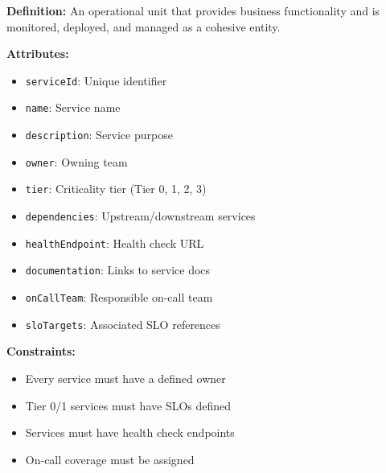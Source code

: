 \documentclass[11pt,letterpaper]{article}
\begin{document}
\begin{definitionbox}
\textbf{Definition:} An operational unit that provides business functionality and is monitored, deployed, and managed as a cohesive entity.

\textbf{Attributes:}
\begin{itemize}[nosep]
    \item \texttt{serviceId}: Unique identifier
    \item \texttt{name}: Service name
    \item \texttt{description}: Service purpose
    \item \texttt{owner}: Owning team
    \item \texttt{tier}: Criticality tier (Tier 0, 1, 2, 3)
    \item \texttt{dependencies}: Upstream/downstream services
    \item \texttt{healthEndpoint}: Health check URL
    \item \texttt{documentation}: Links to service docs
    \item \texttt{onCallTeam}: Responsible on-call team
    \item \texttt{sloTargets}: Associated SLO references
\end{itemize}

\textbf{Constraints:}
\begin{itemize}[nosep]
    \item Every service must have a defined owner
    \item Tier 0/1 services must have SLOs defined
    \item Services must have health check endpoints
    \item On-call coverage must be assigned
\end{itemize}
\end{definitionbox}
\end{document}
